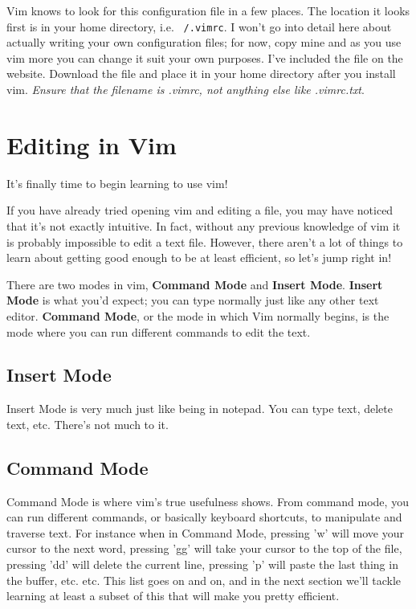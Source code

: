 Vim knows to look for this configuration file in a few places. The location 
it looks first is in your home directory, i.e. \texttt{~/.vimrc}. I won't
go into detail here about actually writing your own configuration files;
for now, copy mine and as you use vim more you can change it suit
your own purposes. I've included the file on the website. %
Download the file and place it in your home directory after you install vim.
{\em Ensure that the filename is .vimrc, not anything else like .vimrc.txt}.

\section{Editing in Vim}
It's finally time to begin learning to use vim!

If you have already tried opening vim and editing a file, you may have
noticed that it's not exactly intuitive. In fact, without any previous
knowledge of vim it is probably impossible to edit a text file. However,
there aren't a lot of things to learn about getting good enough
to be at least efficient, so let's jump right in!

There are two modes in vim, {\bf Command Mode} and {\bf Insert Mode}.
{\bf Insert Mode} is what you'd expect; you can type normally just
like any other text editor. {\bf Command Mode}, or the mode in which
Vim normally begins, is the mode where you can run different commands
to edit the text. 

\subsection{Insert Mode}
Insert Mode is very much just like being in notepad. You can type text, delete
text, etc. There's not much to it. 

\subsection{Command Mode}
Command Mode is where vim's true usefulness shows. From command mode, you can run
different commands, or basically keyboard shortcuts, to manipulate and traverse
text. For instance when in Command Mode, pressing 'w' will move your cursor
to the next word, pressing 'gg' will take your cursor to the top of the file,
pressing 'dd' will delete the current line, pressing 'p' will paste the last
thing in the buffer, etc. etc. This list goes on and on, and in the next section
we'll tackle learning at least a subset of this that will make you pretty efficient.

